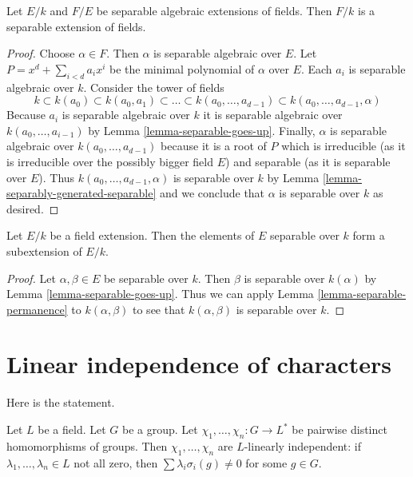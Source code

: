 \begin{lemma}
\label{lemma-separable-permanence}
Let $E/k$ and $F/E$ be separable algebraic extensions of fields. Then $F/k$
is a separable extension of fields.
\end{lemma}

\begin{proof}
Choose $\alpha \in F$. Then $\alpha$ is separable algebraic over $E$.
Let $P = x^d + \sum_{i < d} a_i x^i$ be the minimal polynomial of
$\alpha$ over $E$. Each $a_i$ is separable algebraic over $k$.
Consider the tower of fields
$$
k \subset k(a_0) \subset k(a_0, a_1) \subset \ldots \subset
k(a_0, \ldots, a_{d - 1}) \subset k(a_0, \ldots, a_{d - 1}, \alpha)
$$
Because $a_i$ is separable algebraic over $k$ it is separable algebraic
over $k(a_0, \ldots, a_{i - 1})$ by Lemma \ref{lemma-separable-goes-up}.
Finally, $\alpha$ is separable algebraic over $k(a_0, \ldots, a_{d - 1})$
because it is a root of $P$ which is irreducible
(as it is irreducible over the possibly bigger field $E$)
and separable (as it is separable over $E$).
Thus $k(a_0, \ldots, a_{d - 1}, \alpha)$ is separable over $k$
by Lemma \ref{lemma-separably-generated-separable}
and we conclude that $\alpha$ is separable over $k$ as desired.
\end{proof}

\begin{lemma}
\label{lemma-separable-elements}
Let $E/k$ be a field extension. Then the elements of $E$ separable
over $k$ form a subextension of $E/k$.
\end{lemma}

\begin{proof}
Let $\alpha, \beta \in E$ be separable over $k$. Then $\beta$ is separable
over $k(\alpha)$ by Lemma \ref{lemma-separable-goes-up}.
Thus we can apply Lemma \ref{lemma-separable-permanence} to $k(\alpha, \beta)$
to see that $k(\alpha, \beta)$ is separable over $k$.
\end{proof}





\section{Linear independence of characters}
\label{section-independence-characters}

\noindent
Here is the statement.

\begin{lemma}
\label{lemma-independence-characters}
Let $L$ be a field. Let $G$ be a group. Let
$\chi_1, \ldots, \chi_n : G \to L^*$ be pairwise distinct
homomorphisms of groups. Then $\chi_1, \ldots, \chi_n$
are $L$-linearly independent: if $\lambda_1, \ldots, \lambda_n \in L$
not all zero, then $\sum \lambda_i\sigma_i(g) \not = 0$
for some $g \in G$.
\end{lemma}


